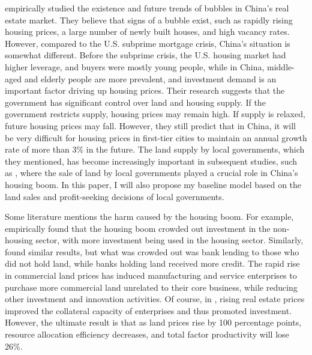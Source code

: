 \documentclass[12pt,english]{article}
\begin{document}
	\cite{glaeser2017real} empirically studied the existence and future trends of bubbles in China's real estate market. They believe that signs of a bubble exist, such as rapidly rising housing prices, a large number of newly built houses, and high vacancy rates. However, compared to the U.S. subprime mortgage crisis, China's situation is somewhat different. Before the subprime crisis, the U.S. housing market had higher leverage, and buyers were mostly young people, while in China, middle-aged and elderly people are more prevalent, and investment demand is an important factor driving up housing prices. Their research suggests that the government has significant control over land and housing supply. If the government restricts supply, housing prices may remain high. If supply is relaxed, future housing prices may fall. However, they still predict that in China, it will be very difficult for housing prices in first-tier cities to maintain an annual growth rate of more than 3\% in the future. The land supply by local governments, which they mentioned, has become increasingly important in subsequent studies, such as \cite{xiong2018mandarin}, where the sale of land by local governments played a crucial role in China's housing boom. In this paper, I will also propose my baseline model based on the land sales and profit-seeking decisions of local governments.
	
	Some literature mentions the harm caused by the housing boom. For example, \cite{wan2024transmission} empirically found that the housing boom crowded out investment in the non-housing sector, with more investment being used in the housing sector. Similarly, \cite{chen2017real} found similar results, but what was crowded out was bank lending to those who did not hold land, while banks holding land received more credit. The rapid rise in commercial land prices has induced manufacturing and service enterprises to purchase more commercial land unrelated to their core business, while reducing other investment and innovation activities. Of course, in \cite{chen2017real}, rising real estate prices improved the collateral capacity of enterprises and thus promoted investment. However, the ultimate result is that as land prices rise by 100 percentage points, resource allocation efficiency decreases, and total factor productivity will lose 26\%.
	
\end{document}
